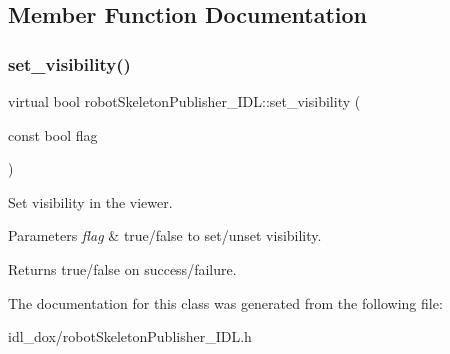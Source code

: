 \subsection{Member Function Documentation}
\mbox{\label{classrobotSkeletonPublisher__IDL_a4484695feff9f11dc7d773fe9a473612}} 
\subsubsection{\texorpdfstring{set\_visibility()}{set\_visibility()}}
{\footnotesize\ttfamily virtual bool robot\+Skeleton\+Publisher\+\_\+\+I\+D\+L\+::set\+\_\+visibility (\begin{DoxyParamCaption}\item[{const bool}]{flag }\end{DoxyParamCaption})\hspace{0.3cm}{\ttfamily [virtual]}}



Set visibility in the viewer. 


\begin{DoxyParams}{Parameters}
{\em flag} & true/false to set/unset visibility. \\
\hline
\end{DoxyParams}
\begin{DoxyReturn}{Returns}
true/false on success/failure. 
\end{DoxyReturn}


The documentation for this class was generated from the following file\+:\begin{DoxyCompactItemize}
\item 
idl\+\_\+dox/robot\+Skeleton\+Publisher\+\_\+\+I\+D\+L.\+h\end{DoxyCompactItemize}
